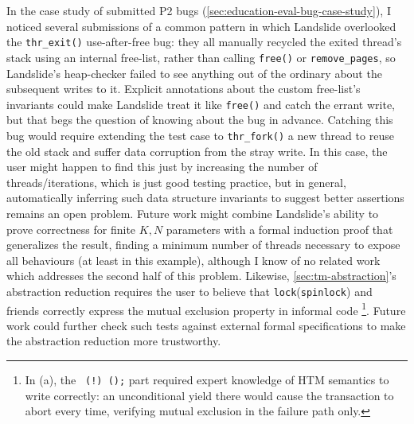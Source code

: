 In the case study of submitted P2 bugs (\cref{sec:education-eval-bug-case-study}),
I noticed several submissions of a common pattern
in which Landslide overlooked the {\tt thr\_exit()} use-after-free bug:
they all manually recycled the exited thread's stack using an internal free-list,
rather than calling {\tt free()} or {\tt remove\_pages},
so Landslide's heap-checker failed to see anything out of the ordinary about the subsequent writes to it.
Explicit annotations about the custom free-list's invariants could make Landslide treat it like {\tt free()}
and catch the errant write,
but that begs the question of knowing about the bug in advance.
Catching this bug would require extending the test case to {\tt thr\_fork()} a new thread
to reuse the old stack and suffer data corruption from the stray write.
In this case, the user might happen to find this just by increasing the number of threads/iterations,
which is just good testing practice,
but in general, automatically inferring such data structure invariants
to suggest better assertions
remains an open problem.
Future work might combine Landslide's ability to prove correctness for finite $K,N$ parameters
with a formal induction proof that generalizes the result,
finding a minimum number of threads necessary to expose all behaviours
(at least  in this example),
although I know of no related work which addresses the second half of this problem.
Likewise, \cref{sec:tm-abstraction}'s abstraction reduction requires the user
to believe that {\tt lock}({\tt spinlock}) and friends correctly express the mutual exclusion property in informal code%
\footnote{In (a), the
{\tt {} (!) ();}
part required expert knowledge of HTM semantics to write correctly:
an unconditional yield there
would cause %
the transaction to abort every time,
verifying mutual exclusion in the failure path only.}.
Future work could further check such tests against external formal specifications
to make the abstraction reduction more trustworthy.


